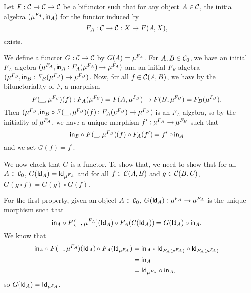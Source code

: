 \begin{solution}\label{sol:initialalg_for_bifunctor_functor}
	Let $F:\CC\to\CC\to\CC$ be a bifunctor such that for any object $A\in\CC$, the initial algebra $ (\Initalg{F_A}, \In_A) $ for the functor induced by 
	\[ F_A : \CC\to\CC : X \mapsto F(A,X), \]
	exists.
	
	We define a functor $ G: \CC \to \CC $ by $ G(A) = \Initalg{F_A} $. For $ A, B \in \Ob\CC $, we have an initial $ F_A $-algebra $ (\Initalg{F_A}, \In_A: F_A(\Initalg{F_A}) \to \Initalg{F_A}) $ and an initial $ F_B $-algebra $ (\Initalg{F_B}, \In_B: F_B(\Initalg{F_B}) \to \Initalg{F_B}) $. Now, for all $ f \in \CC(A, B) $, we have by the bifunctoriality of $ F $, a morphism
	\[ F(\_, \Initalg{F_B})(f): F_A(\Initalg{F_B}) = F(A, \Initalg{F_B}) \to F(B, \Initalg{F_B}) = F_B(\Initalg{F_B}). \]
	Then $ (\Initalg{F_B}, \In_B \circ F(\_, \Initalg{F_B})(f): F_A(\Initalg{F_B}) \to \Initalg{F_B}) $ is an $ F_A $-algebra, so by the initiality of $ \Initalg{F_A} $, we have a unique morphism $ f^\prime: \Initalg{F_A} \to \Initalg{F_B} $ such that 
	\[ \In_B \circ F(\_, \Initalg{F_B})(f) \circ F_A(f^\prime) = f^\prime \circ \In_A \]
	and we set $ G(f) = f^\prime $.
	
	We now check that $ G $ is a functor. To show that, we need to show that for all $ A \in \Ob \CC $, $ G(\Id[A]) = \Id[\Initalg{F_A}] $ and for all $ f \in \CC(A, B) $ and $ g \in \CC(B, C) $, $ G(g \circ f) = G(g) \circ G(f) $.

	For the first property, given an object $ A \in \Ob \CC $, $ G(\Id[A]): \Initalg{F_A} \to \Initalg{F_A} $ is the unique morphism such that
	\[ \In_A \circ F(\_, \Initalg{F_A})(\Id[A]) \circ F_A(G(\Id[A])) = G(\Id[A]) \circ \In_A. \]
	We know that
	\begin{align*}
		\In_A \circ F(\_, \Initalg{F_A})(\Id[A]) \circ F_A(\Id[\Initalg{F_A}]) &= \In_A \circ \Id[F_A(\Initalg{F_A})] \circ \Id[F_A(\Initalg{F_A})]\\
		&= \In_A\\
		&= \Id[\Initalg{F_A}] \circ \In_A,
	\end{align*}
	so $ G(\Id[A]) = \Id[\Initalg{F_A}] $.


\end{solution}
